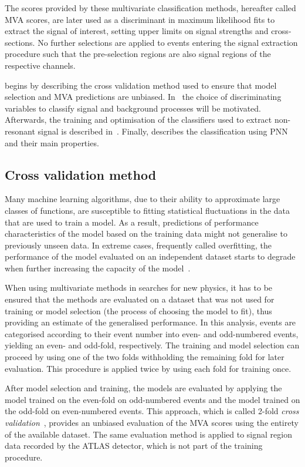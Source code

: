 The scores provided by these multivariate classification methods,
hereafter called MVA scores, are later used as a discriminant in
maximum likelihood fits to extract the signal of interest, setting
upper limits on signal strengths and cross-sections. No further
selections are applied to events entering the signal extraction
procedure such that the pre-selection regions are also signal regions
of the respective channels.

 begins by describing the cross
validation method used to ensure that model selection and MVA
predictions are unbiased.  In~
the choice of discriminating variables to classify signal and
background processes will be motivated. Afterwards, the training and
optimisation of the classifiers used to extract non-resonant signal is
described in~. Finally, 
describes the classification using PNN and their main properties.


\subsection{Cross validation method}
\label{sec:mva_crossvalidation}

Many machine learning algorithms, due to their ability to approximate
large classes of functions, are susceptible to fitting statistical
fluctuations in the data that are used to train a model. As a result,
predictions of performance characteristics of the model based on the
training data might not generalise to previously unseen data. In
extreme cases, frequently called overfitting, the performance of the
model evaluated on an independent dataset starts to degrade when
further increasing the capacity of the model~\cite{hastie09}.

When using multivariate methods in searches for new physics, it has to
be ensured that the methods are evaluated on a dataset that was not
used for training or model selection (the process of choosing the
model to fit), thus providing an estimate of the generalised
performance. In this analysis, events are categorised according to
their event number into even- and odd-numbered events, yielding an
even- and odd-fold, respectively. The training and model selection can
proceed by using one of the two folds withholding the remaining fold
for later evaluation. This procedure is applied twice by using each
fold for training once.

After model selection and training, the models are evaluated by
applying the model trained on the even-fold on odd-numbered events and
the model trained on the odd-fold on even-numbered events. This
approach, which is called 2-fold \emph{cross
  validation}~\cite{hastie09,bishop06}, provides an unbiased
evaluation of the MVA scores using the entirety of the available
dataset. The same evaluation method is applied to signal region data
recorded by the ATLAS detector, which is not part of the training
procedure.

